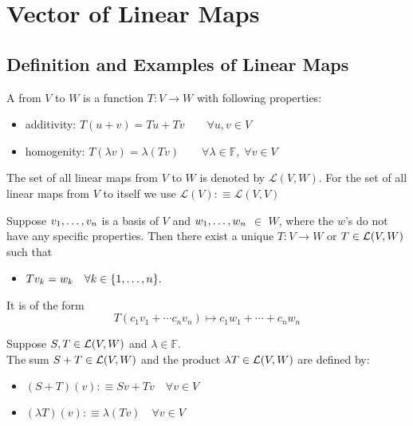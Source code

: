 \section{Vector of Linear Maps}

\subsection{Definition and Examples of Linear Maps}

\begin{mydef} 
  A \lm from $V$ to $W$ is a function $T:V\to W$ with following properties:
  \begin{itemize}
    \item additivity: $T(u+v)=Tu + Tv \qquad \forall u,v \in V$
    \item homogenity: $T(\lambda v)=\lambda (Tv) \qquad
    \forall \lambda \in \mathbb{F}, \; \forall v\in V$
  \end{itemize}
\end{mydef}

\begin{mydef} 
  The set of all linear maps from $V$ to $W$ is denoted by $\mathcal{L}(V,W)$. For the set of all linear maps from $V$ to itself we use $\mathcal{L}(V) :\equiv \mathcal{L}(V,V)$
\end{mydef}

\setcounter{thm}{3}
\begin{thm}
  Suppose $v_1, \dots, v_n$ is a basis of $V$ and $w_1, \dots, w_n$ $\in$ $W$, where the $w$'s do not have any specific properties. Then there exist a unique \lm $T:V\to W$ or $T \in \mathcal{L}(V,W)$ such that
  \begin{itemize}
    \item[] $Tv_{k} = w_k \quad \forall k \in \{1, \dots, n \}.$
  \end{itemize}
  It is of the form \begin{equation}
    T(c_1 v_1 + \cdots c_n v_n) \mapsto c_1 w_1 + \cdots + c_n w_n
  \end{equation}
\end{thm}

\setcounter{thm}{4}
\begin{mydef} 
  Suppose $S, T \in {\mathcal{L}(V,W)}$ and $\lambda \in \mathbb{F}.$ \\
  The sum $S+T \in \mathcal{L} (V,W)$ and the product $\lambda T \in \mathcal{L} (V,W)$ are defined by:
  \begin{itemize}
    \item $(S+T)(v) :\equiv Sv+Tv \quad \forall v \in V$
    \item $(\lambda T)(v) : \equiv \lambda (Tv) \quad \forall v \in V$
  \end{itemize}
\end{mydef}

